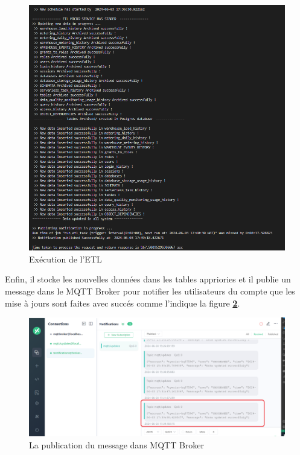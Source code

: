 \begin{figure}[H]
    \centering
    \includegraphics[width =1\linewidth]{img/captures/etl/results.PNG}
    \caption{Exécution de l'ETL}
        \label{fig:result}
\end{figure}
\par Enfin, il stocke les nouvelles données dans les tables appriories et il publie un message dans le MQTT Broker pour notifier les utilisateurs du compte que les mise à jours sont faites avec succés comme l'indique la figure \textbf{\ref{fig:mqtt}}.

\begin{figure}[H]
    \centering
    \includegraphics[width =1\linewidth]{img/captures/etl/mqtt.PNG}
    \caption{La publication du message dans MQTT Broker}
        \label{fig:mqtt}
\end{figure}

